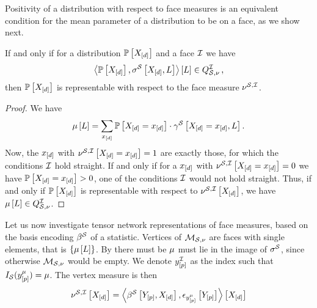 Positivity of a distribution with respect to face measures is an equivalent condition for the mean parameter of a distribution to be on a face, as we show next.

\begin{theorem}
    \label{the:facePolytopeCharacterization}
    If and only if for a distribution $\mathbb{P}\left[X_{[d]}\right]$ and a face $\mathcal{I}$ we have
    \begin{align*}
        \left\langle \mathbb{P}\left[X_{[d]}\right],\sigma^{\mathcal{S}}\left[X_{[d]},L\right]\right\rangle \left[ L \right]\in Q^{\mathcal{I}}_{\mathcal{S},\nu}\, ,
    \end{align*}
    then $\mathbb{P}\left[X_{[d]}\right]$ is representable with respect to the face measure $\nu^{\mathcal{S},\mathcal{I}}$.
\end{theorem}
\begin{proof}
    We have
    \begin{align*}
        \mu\left[L\right] = \sum_{x_{[d]}} \mathbb{P}\left[X_{[d]}=x_{[d]}\right]\cdot\gamma^{\mathcal{S}}\left[X_{[d]}=x_{[d]},L\right] .
    \end{align*}
    Now, the $x_{[d]}$ with $\nu^{\mathcal{S},\mathcal{I}}\left[X_{[d]}=x_{[d]}\right]=1$ are exactly those, for which the conditions $\mathcal{I}$ hold straight.
    If and only if for a $x_{[d]}$ with $\nu^{\mathcal{S},\mathcal{I}}\left[X_{[d]}=x_{[d]}\right]=0$ we have $\mathbb{P}\left[X_{[d]}=x_{[d]}\right]>0$, one of the conditions $\mathcal{I}$ would not hold straight.
    Thus, if and only if $\mathbb{P}\left[X_{[d]}\right]$ is representable with respect to $\nu^{\mathcal{S},\mathcal{I}}\left[X_{[d]}\right]$, we have $\mu\left[L\right]\in Q^{\mathcal{I}}_{\mathcal{S},\nu}$.
\end{proof}


Let us now investigate tensor network representations of face measures, based on the basis encoding $\beta^{\mathcal{S}}$ of a statistic.
Vertices of $\mathcal{M}_{\mathcal{S},\nu}$ are faces with single elements, that is $\{\mu\left[L\right]\}$.
By  there must be $\mu$ must lie in the image of $\sigma^{\mathcal{S}}$, since otherwise $\mathcal{M}_{\mathcal{S},\nu}$ would be empty.
We denote $y^{\mathcal{I}}_{[p]}$ as the index such that $I_{\mathcal{S}}(y^{\mu}_{[p]})=\mu$.
The vertex measure is then
\begin{align*}
    \nu^{\mathcal{S},\mathcal{I}}\left[X_{[d]}\right]
    = \left\langle \beta^{\mathcal{S}}\left[Y_{[p]},X_{[d]}\right],\epsilon_{y^{\mu}_{[p]}}\left[Y_{[p]}\right]\right\rangle \left[ X_{[d]} \right]
\end{align*}

